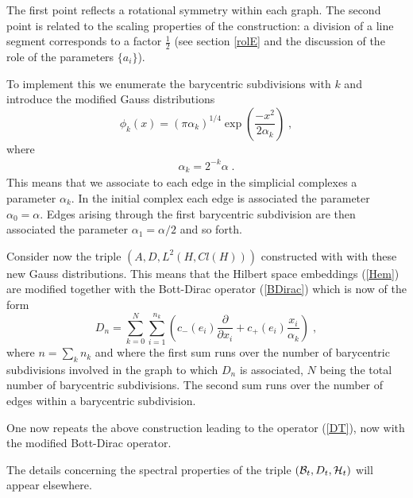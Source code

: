 \documentclass[12pt]{article}
\newcommand{\ba}{\begin{eqnarray}}
\newcommand{\ea}{\end{eqnarray}}
\def\a{\alpha}
\def\p{\pi}
\def\cb{{\cal B}}
\def\ch{{\cal H}}
\newcommand{\pa}{\partial}
\begin{document}
The first point reflects a rotational symmetry within each graph. The second point is related to the scaling properties of the construction: a division of a line segment corresponds to a factor $\frac{1}{2}$ (see section \ref{rolE} and the discussion of the role of the parameters $\{a_i\}$).



To implement this we enumerate the barycentric subdivisions with $k$ and introduce the modified Gauss distributions
\[
\phi_k(x) =(\p\a_k)^{1/4} \exp\left(\frac{-x^2}{2\a_k}\right)\;,
\]
where
\ba 
\a_k = 2^{-k}\a\;.
\label{tHe}
\ea
This means that we associate to each edge in the simplicial complexes a parameter $\a_k$. In the initial complex each edge is associated the parameter $\a_0=\a$. Edges arising through the first barycentric subdivision are then associated the parameter $\a_1=\a/2 $ and so forth.

Consider now the triple $(A,D,L^2(H,Cl(H)))$ constructed with with these new Gauss distributions. This means that the Hilbert space embeddings (\ref{Hem}) are modified together with the Bott-Dirac operator (\ref{BDirac}) which is now of the form
\[ 
D_n = \sum_{k=0}^N\sum_{i=1}^{n_k} \left( c_-(e_i)\frac{\pa}{\pa x_i} + c_+(e_i)\frac{x_i}{\a_k} \right)\;,
\]
where $n=\sum_k n_k$ and where the first sum runs over the number of barycentric subdivisions involved in the graph to which $D_n$ is associated, $N$ being the total number of barycentric subdivisions. The second sum runs over the number of edges within a barycentric subdivision. 

One now repeats the above construction leading to the operator (\ref{DT}), now with the modified Bott-Dirac operator.


The details concerning the spectral properties of the triple $(\cb_t,D_t,\ch_t)$ will appear elsewhere.



\end{document}
